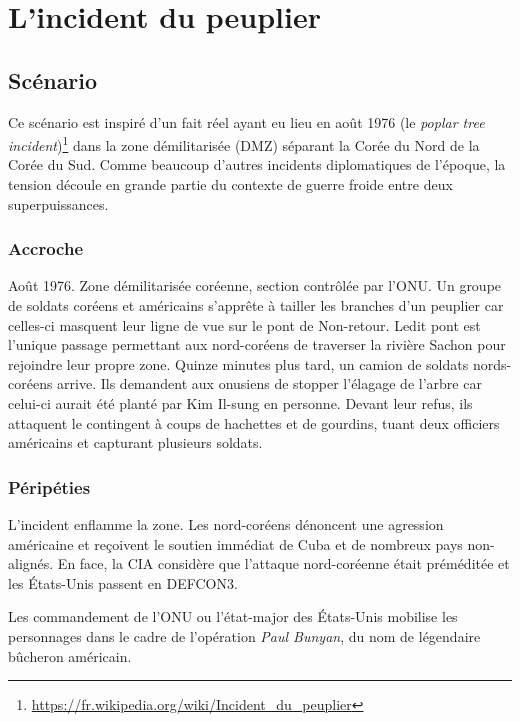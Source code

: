 \chapter{L'incident du peuplier}

\section{Scénario}

Ce scénario est inspiré d'un fait réel ayant eu lieu en août 1976 (le \emph{poplar tree incident})\footnote{\url{https://fr.wikipedia.org/wiki/Incident_du_peuplier}} dans la zone démilitarisée (DMZ) séparant la Corée du Nord de la Corée du Sud.
Comme beaucoup d'autres incidents diplomatiques de l'époque, la tension découle en grande partie du contexte de guerre froide entre deux superpuissances.

\subsection{Accroche}

Août 1976. Zone démilitarisée coréenne, section contrôlée par l'ONU. Un groupe de soldats coréens et américains s'apprête à tailler les branches d'un peuplier car celles-ci masquent leur ligne de vue sur le \og pont de Non-retour\fg.
Ledit pont est l'unique passage permettant aux nord-coréens de traverser la rivière Sachon pour rejoindre leur propre zone.
Quinze minutes plus tard, un camion de soldats nords-coréens arrive.
Ils demandent aux onusiens de stopper l'élagage de l'arbre car celui-ci aurait été planté par Kim Il-sung en personne.
Devant leur refus, ils attaquent le contingent à coups de hachettes et de gourdins, tuant deux officiers américains et capturant plusieurs soldats.

\subsection{Péripéties}

L'incident enflamme la zone.
Les nord-coréens dénoncent une agression américaine et reçoivent le soutien immédiat de Cuba et de nombreux pays non-alignés.
En face, la CIA considère que l'attaque nord-coréenne était préméditée et les États-Unis passent en DEFCON3.

Les commandement de l'ONU ou l'état-major des États-Unis mobilise les personnages dans le cadre de l'opération \emph{Paul Bunyan}, du nom de légendaire bûcheron américain.

